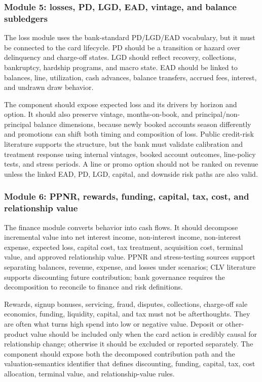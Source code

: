 \documentclass[11pt]{article}
\newcommand{\1}{\mathbf{1}}
\begin{document}
\subsubsection{Module 5: losses, PD, LGD, EAD, vintage, and balance subledgers}
\label{subsec:module-losses}

The loss module uses the bank-standard PD/LGD/EAD vocabulary, but it must be
connected to the card lifecycle. PD should be a transition or hazard over
delinquency and charge-off states. LGD should reflect recovery, collections,
bankruptcy, hardship programs, and macro state. EAD should be linked to
balances, line, utilization, cash advances, balance transfers, accrued fees,
interest, and undrawn draw behavior.

The component should expose expected loss and its drivers by horizon and
option. It should also preserve vintage, months-on-book, and
principal/non-principal balance dimensions, because newly booked accounts
season differently and promotions can shift both timing and composition of
loss. Public credit-risk literature supports the structure, but the bank must
validate calibration and treatment response using internal vintages, booked
account outcomes, line-policy tests, and stress periods. A line or promo
option should not be ranked on revenue unless the linked EAD, PD, LGD, capital,
and downside risk paths are also valid.

\subsubsection{Module 6: PPNR, rewards, funding, capital, tax, cost, and relationship value}
\label{subsec:module-ppnr}

The finance module converts behavior into cash flows. It should decompose
incremental value into net interest income, non-interest income, non-interest
expense, expected loss, capital cost, tax treatment, acquisition cost, terminal
value, and approved relationship value. PPNR and stress-testing sources
support separating balances, revenue, expense, and losses under scenarios; CLV
literature supports discounting future contribution; bank governance requires
the decomposition to reconcile to finance and risk definitions.

Rewards, signup bonuses, servicing, fraud, disputes, collections, charge-off
sale economics, funding, liquidity, capital, and tax must not be afterthoughts.
They are often what turns high spend into low or negative value. Deposit or
other-product value should be included only when the card action is credibly
causal for relationship change; otherwise it should be excluded or reported
separately. The component should expose both the decomposed contribution path
and the valuation-semantics identifier that defines discounting, funding,
capital, tax, cost allocation, terminal value, and relationship-value rules.
\end{document}
